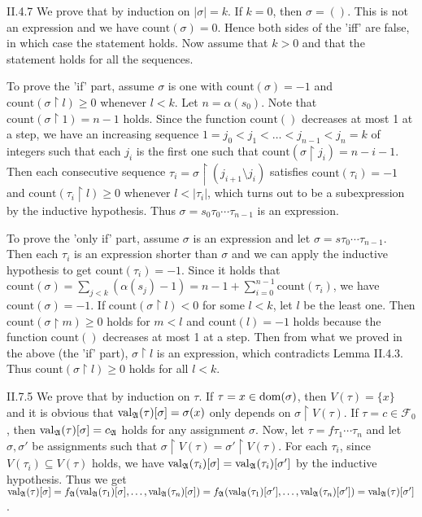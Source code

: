 \documentclass[12pt]{article}
\begin{document}
\begin{customthm}{II.4.7}
  We prove that by induction on $|\sigma|=k$. If $k=0$, then $\sigma=()$. This is not an expression and we have $\mathrm{count}(\sigma)=0$. Hence both sides of the 'iff' are false, in which case the statement holds. Now assume that $k>0$ and that the statement holds for all the sequences.

  To prove the 'if' part, assume $\sigma$ is one with $\mathrm{count}(\sigma)=-1$ and $\mathrm{count}(\sigma\upharpoonright l)\geq0$ whenever $l<k$. Let $n=\alpha(s_0)$. Note that $\mathrm{count}(\sigma\upharpoonright1)=n-1$ holds. Since the function $\mathrm{count}()$ decreases at most 1 at a step, we have an increasing sequence $1=j_0<j_1<\ldots<j_{n-1}<j_n=k$ of integers such that each $j_i$ is the first one such that $\mathrm{count}(\sigma\upharpoonright j_i)=n-i-1$. Then each consecutive sequence $\tau_i=\sigma\upharpoonright(j_{i+1}\setminus j_i)$ satisfies $\mathrm{count}(\tau_i)=-1$ and $\mathrm{count}(\tau_i\upharpoonright l)\geq0$ whenever $l<|\tau_i|$, which turns out to be a subexpression by the inductive hypothesis. Thus $\sigma=s_0\tau_0\cdots\tau_{n-1}$ is an expression.

  To prove the 'only if' part, assume $\sigma$ is an expression and let $\sigma=s\tau_0\cdots\tau_{n-1}$. Then each $\tau_i$ is an expression shorter than $\sigma$ and we can apply the inductive hypothesis to get $\mathrm{count}(\tau_i)=-1$. Since it holds that $\mathrm{count}(\sigma)=\sum_{j<k}(\alpha(s_j)-1)=n-1+\sum_{i=0}^{n-1}\mathrm{count}(\tau_i)$, we have $\mathrm{count}(\sigma)=-1$. If $\mathrm{count}(\sigma\upharpoonright l)<0$ for some $l<k$, let $l$ be the least one. Then $\mathrm{count}(\sigma\upharpoonright m)\geq0$ holds for $m<l$ and $\mathrm{count}(l)=-1$ holds because the function $\mathrm{count}()$ decreases at most 1 at a step. Then from what we proved in the above (the 'if' part), $\sigma\upharpoonright l$ is an expression, which contradicts Lemma II.4.3. Thus $\mathrm{count}(\sigma\upharpoonright l)\geq0$ holds for all $l<k$.
\end{customthm}

\begin{customthm}{II.7.5}
  We prove that by induction on $\tau$. If $\tau=x\in\mathop{\mathrm{dom}}(\sigma)$, then $V(\tau)=\{x\}$ and it is obvious that $\mathop{\mathrm{val}}_\mathfrak{A}(\tau)[\sigma]=\sigma(x)$ only depends on $\sigma\upharpoonright V(\tau)$. If $\tau=c\in\mathcal{F}_0$, then $\mathop{\mathrm{val}}_\mathfrak{A}(\tau)[\sigma]=c_\mathfrak{A}$ holds for any assignment $\sigma$. Now, let $\tau=f\tau_1\cdots\tau_n$ and let $\sigma,\sigma'$ be assignments such that $\sigma\upharpoonright V(\tau)=\sigma'\upharpoonright V(\tau)$. For each $\tau_i$, since $V(\tau_i)\subseteq V(\tau)$ holds, we have $\mathop{\mathrm{val}}_\mathfrak{A}(\tau_i)[\sigma]=\mathop{\mathrm{val}}_\mathfrak{A}(\tau_i)[\sigma']$ by the inductive hypothesis. Thus we get $\mathop{\mathrm{val}}_\mathfrak{A}(\tau)[\sigma]=f_\mathfrak{A}(\mathop{\mathrm{val}}_\mathfrak{A}(\tau_1)[\sigma],\ldots,\mathop{\mathrm{val}}_\mathfrak{A}(\tau_n)[\sigma])=f_\mathfrak{A}(\mathop{\mathrm{val}}_\mathfrak{A}(\tau_1)[\sigma'],\ldots,\mathop{\mathrm{val}}_\mathfrak{A}(\tau_n)[\sigma'])=\mathop{\mathrm{val}}_\mathfrak{A}(\tau)[\sigma']$.
\end{customthm}
\end{document}
